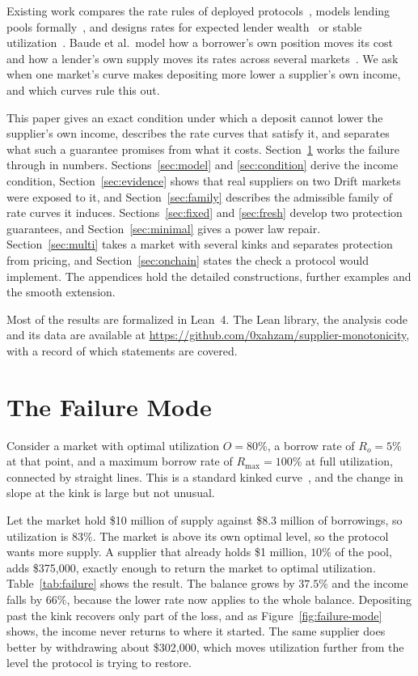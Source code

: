 \documentclass[11pt,a4paper]{article}
\begin{document}
Existing work compares the rate rules of deployed protocols~\cite{gudgeon}, models lending pools formally~\cite{bartoletti}, and designs rates for expected lender wealth~\cite{baude-optimal} or stable utilization~\cite{agilerate}. Baude et al.\ model how a borrower's own position moves its cost~\cite{baude-leverage} and how a lender's own supply moves its rates across several markets~\cite{baude-allocation}. We ask when one market's curve makes depositing more lower a supplier's own income, and which curves rule this out.

This paper gives an exact condition under which a deposit cannot lower the supplier's own income, describes the rate curves that satisfy it, and separates what such a guarantee promises from what it costs. Section~\ref{sec:failure} works the failure through in numbers. Sections~\ref{sec:model} and \ref{sec:condition} derive the income condition, Section~\ref{sec:evidence} shows that real suppliers on two Drift markets were exposed to it, and Section~\ref{sec:family} describes the admissible family of rate curves it induces. Sections~\ref{sec:fixed} and \ref{sec:fresh} develop two protection guarantees, and Section~\ref{sec:minimal} gives a power law repair. Section~\ref{sec:multi} takes a market with several kinks and separates protection from pricing, and Section~\ref{sec:onchain} states the check a protocol would implement. The appendices hold the detailed constructions, further examples and the smooth extension.

Most of the results are formalized in Lean~4. The Lean library, the analysis code and its data are available at \url{https://github.com/0xahzam/supplier-monotonicity}, with a record of which statements are covered.

\section{The Failure Mode}
\label{sec:failure}

Consider a market with optimal utilization $O=80\%$, a borrow rate of $R_o=5\%$ at that point, and a maximum borrow rate of $R_{\max}=100\%$ at full utilization, connected by straight lines. This is a standard kinked curve~\cite{aave}, and the change in slope at the kink is large but not unusual.

Let the market hold \$10 million of supply against \$8.3 million of borrowings, so utilization is $83\%$. The market is above its own optimal level, so the protocol wants more supply. A supplier that already holds \$1 million, $10\%$ of the pool, adds \$375{,}000, exactly enough to return the market to optimal utilization. Table~\ref{tab:failure} shows the result. The balance grows by $37.5\%$ and the income falls by $66\%$, because the lower rate now applies to the whole balance. Depositing past the kink recovers only part of the loss, and as Figure~\ref{fig:failure-mode} shows, the income never returns to where it started. The same supplier does better by withdrawing about \$302{,}000, which moves utilization further from the level the protocol is trying to restore.
\end{document}
